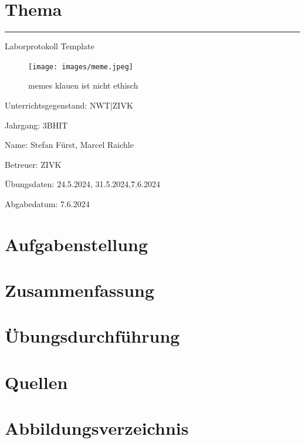 \documentclass[a4paper]{article}
\begin{document}

\pagestyle{oida}
\section*{Thema}
\par\noindent\rule{\textwidth}{0.4pt}

Laborprotokoll
Template

\begin{figure}[h]
	\texttt{[image: images/meme.jpeg]}
	\caption{memes klauen ist nicht ethisch}
\end{figure}

\vspace*{\fill}
Unterrichtsgegenstand:	NWT|ZIVK

Jahrgang:	3BHIT

Name:	Stefan Fürst, Marcel Raichle

Betreuer: 	ZIVK

Übungsdaten:	24.5.2024, 31.5.2024,7.6.2024

Abgabedatum:	7.6.2024


\newpage
\tableofcontents

\newpage

\section{Aufgabenstellung}



\section{Zusammenfassung}


\newpage

\section{Übungsdurchführung}


\newpage
\section{Quellen}

\newpage
\section{Abbildungsverzeichnis}

\listoffigures
\end{document}
